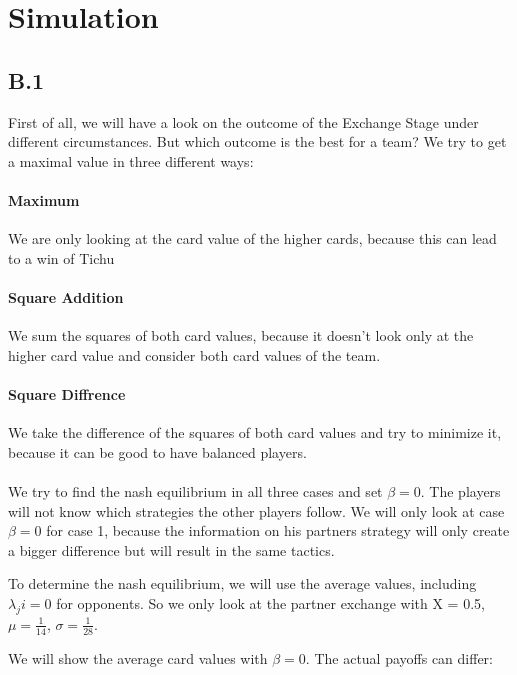 \section{Simulation}
\subsection{B.1}
First of all, we will have a look on the outcome of the Exchange Stage under different circumstances. But which outcome is the best for a team? We try to get a maximal value in three different ways:

\paragraph{Maximum}  We are only looking at the card value of the higher cards, because this can lead to a win of Tichu
\paragraph{Square Addition}  We sum the squares of both card values, because it doesn’t look only at the higher card value and consider both card values of the team.
\paragraph{Square Diffrence} We take the difference of the squares of both card values and try to minimize it, because it can be good to have balanced players. 
\\
\\
We try to find the nash equilibrium in all three cases and set $\beta = 0$. The players will not know which strategies the other players follow. We will only look at case $\beta = 0$ for case 1, because the information on his partners strategy will only create a bigger difference but will result in the same tactics. 

To determine the nash equilibrium, we will use the average values, including $\lambda_ji = 0$ for opponents. So we only look at the partner exchange with X = 0.5, $\mu = \frac{1}{14}$, $\sigma = \frac{1}{28}$.

We will show the average card values with $\beta =0$. The actual payoffs can differ:
\begin{table}[h]
\end{table}

